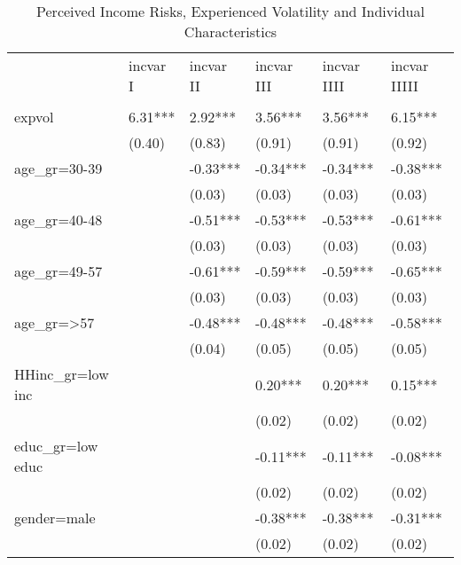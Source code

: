 \begin{table}[p]
\centering
\begin{adjustbox}{width=\textwidth}
\begin{threeparttable}
\caption{Perceived Income Risks, Experienced Volatility and Individual Characteristics}
\label{micro_reg}\begin{tabular}{llllll}
\toprule
{} & incvar I & incvar II & incvar III & incvar IIII & incvar IIIII \\
                 &          &           &            &             &              \\
\midrule
expvol           &  6.31*** &   2.92*** &    3.56*** &     3.56*** &      6.15*** \\
                 &   (0.40) &    (0.83) &     (0.91) &      (0.91) &       (0.92) \\
age\_gr=30-39     &          &  -0.33*** &   -0.34*** &    -0.34*** &     -0.38*** \\
                 &          &    (0.03) &     (0.03) &      (0.03) &       (0.03) \\
age\_gr=40-48     &          &  -0.51*** &   -0.53*** &    -0.53*** &     -0.61*** \\
                 &          &    (0.03) &     (0.03) &      (0.03) &       (0.03) \\
age\_gr=49-57     &          &  -0.61*** &   -0.59*** &    -0.59*** &     -0.65*** \\
                 &          &    (0.03) &     (0.03) &      (0.03) &       (0.03) \\
age\_gr=>57       &          &  -0.48*** &   -0.48*** &    -0.48*** &     -0.58*** \\
                 &          &    (0.04) &     (0.05) &      (0.05) &       (0.05) \\
HHinc\_gr=low inc &          &           &    0.20*** &     0.20*** &      0.15*** \\
                 &          &           &     (0.02) &      (0.02) &       (0.02) \\
educ\_gr=low educ &          &           &   -0.11*** &    -0.11*** &     -0.08*** \\
                 &          &           &     (0.02) &      (0.02) &       (0.02) \\
gender=male      &          &           &   -0.38*** &    -0.38*** &     -0.31*** \\
                 &          &           &     (0.02) &      (0.02) &       (0.02) \\

\end{tabular}
\end{threeparttable}
\end{adjustbox}
\end{table}
